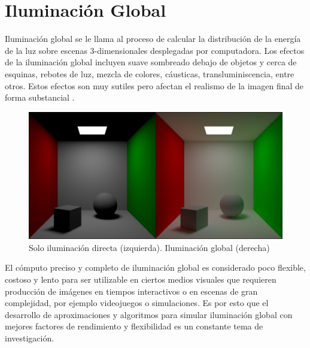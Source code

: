\section{Iluminación Global}

Iluminación global se le llama al proceso de calcular la distribución de la energía de la luz sobre escenas 3-dimensionales desplegadas por computadora. Los efectos de la iluminación global incluyen suave sombreado debajo de objetos y cerca de esquinas, rebotes de luz, mezcla de colores, cáusticas, transluminiscencia, entre otros. Estos efectos son muy sutiles pero afectan el realismo de la imagen final de forma substancial \cite{pixar_renderman_intro}.

\begin{figure}[H]
	\centering
	\includegraphics[width=0.985\linewidth]{media/direct_vs_indirect.png}
	\caption{Solo iluminación directa (izquierda). Iluminación global (derecha)}
	\label{fig:gi_comparison}
\end{figure}

El cómputo preciso y completo de iluminación global es considerado poco flexible, costoso y lento para ser utilizable en ciertos medios visuales que requieren producción de imágenes en tiempos interactivos o en escenas de gran complejidad, por ejemplo videojuegos o simulaciones. Es por esto que el desarrollo de aproximaciones y algoritmos para simular iluminación global con mejores factores de rendimiento y flexibilidad es un constante tema de investigación.
